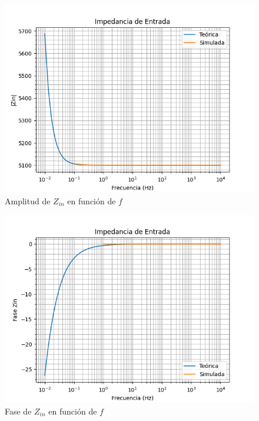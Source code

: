 \begin{figure}[H]
    \centering 
    \includegraphics [scale=1] {../Ejercicio3-CircuitoIntegradoresyDerivadores/Imagenes/comparativo-integrador-zin-amplitud.png} 
    \caption{Amplitud de $Z_{in}$ en función de $f$}
    \label{fig:emptyPlotTool}
\end{figure}

\begin{figure}[H]
    \centering 
    \includegraphics [scale=1] {../Ejercicio3-CircuitoIntegradoresyDerivadores/Imagenes/comparativo-integrador-zin-fase.png} 
    \caption{Fase de $Z_{in}$ en función de $f$ }
    \label{fig:emptyPlotTool}
\end{figure}


